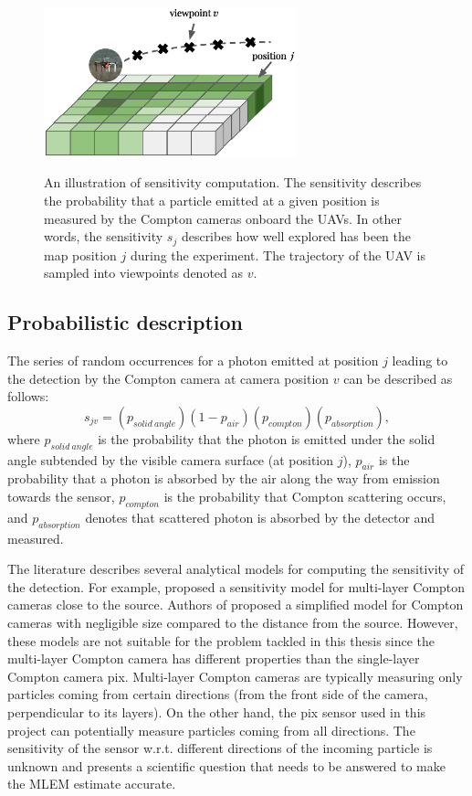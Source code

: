 \begin{figure}[!h]
  \centering
    \includegraphics[width=0.65\textwidth]{./fig/photos/sen.eps}
    \label{fig:sen_illustration}
  \caption{An illustration of sensitivity computation. The sensitivity describes the probability that a particle emitted at a given position is measured by the Compton cameras onboard the \ac{UAV}s. In other words, the sensitivity $s_{j}$ describes how well explored has been the map position $j$ during the experiment. The trajectory of the \ac{UAV} is sampled into viewpoints denoted as $v$.}
\end{figure}%

\subsection{Probabilistic description}%
The series of random occurrences for a photon emitted at position $j$ leading to the detection by the Compton camera at camera position $v$ can be described as follows:
\begin{equation}
  s_{jv} =  (p_{solid\ angle})(1-p_{air})(p_{compton})(p_{absorption}),
  \label{eq:sen_prob}
\end{equation}
where $p_{solid\ angle}$ is the probability that the photon is emitted under the solid angle subtended by the visible camera surface (at position $j$), 
$p_{air}$ is the probability that a photon is absorbed by the air along the way from emission towards the sensor, 
$p_{compton}$ is the probability that Compton scattering occurs, and $p_{absorption}$ denotes that scattered photon is absorbed by the detector and measured.

The literature describes several analytical models for computing the sensitivity of the detection. 
For example, \cite{wilderman2001} proposed a sensitivity model for multi-layer Compton cameras close to the source.
Authors of \cite{maxim2016} proposed a simplified model for Compton cameras with negligible size compared to the distance from the source.
However, these models are not suitable for the problem tackled in this thesis since the multi-layer Compton camera has different properties than the single-layer Compton camera \ac{pix}.
Multi-layer Compton cameras are typically measuring only particles coming from certain directions (from the front side of the camera, perpendicular to its layers).
On the other hand, the \ac{pix} sensor used in this project can potentially measure particles coming from all directions.
The sensitivity of the sensor w.r.t. different directions of the incoming particle is unknown and presents a scientific question that needs to be answered to make the \ac{MLEM} estimate accurate. 

